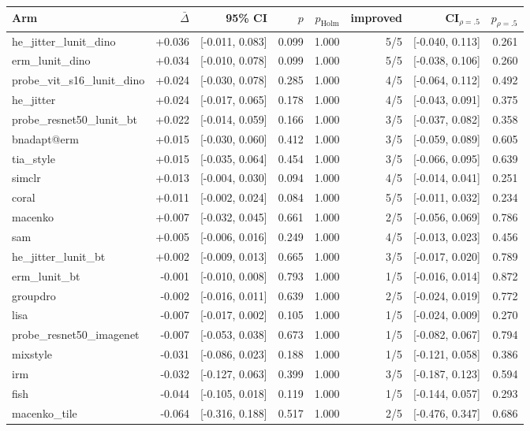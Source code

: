 \begin{tabular}{lrrrrrrr}
\toprule
Arm & $\bar\Delta$ & 95\% CI & $p$ & $p_\text{Holm}$ & improved & CI$_{\rho=.5}$ & $p_{\rho=.5}$ \\
\midrule
he\_jitter\_lunit\_dino & +0.036 & [-0.011, 0.083] & 0.099 & 1.000 & 5/5 & [-0.040, 0.113] & 0.261 \\
erm\_lunit\_dino & +0.034 & [-0.010, 0.078] & 0.099 & 1.000 & 5/5 & [-0.038, 0.106] & 0.260 \\
probe\_vit\_s16\_lunit\_dino & +0.024 & [-0.030, 0.078] & 0.285 & 1.000 & 4/5 & [-0.064, 0.112] & 0.492 \\
he\_jitter & +0.024 & [-0.017, 0.065] & 0.178 & 1.000 & 4/5 & [-0.043, 0.091] & 0.375 \\
probe\_resnet50\_lunit\_bt & +0.022 & [-0.014, 0.059] & 0.166 & 1.000 & 3/5 & [-0.037, 0.082] & 0.358 \\
bnadapt@erm & +0.015 & [-0.030, 0.060] & 0.412 & 1.000 & 3/5 & [-0.059, 0.089] & 0.605 \\
tia\_style & +0.015 & [-0.035, 0.064] & 0.454 & 1.000 & 3/5 & [-0.066, 0.095] & 0.639 \\
simclr & +0.013 & [-0.004, 0.030] & 0.094 & 1.000 & 4/5 & [-0.014, 0.041] & 0.251 \\
coral & +0.011 & [-0.002, 0.024] & 0.084 & 1.000 & 5/5 & [-0.011, 0.032] & 0.234 \\
macenko & +0.007 & [-0.032, 0.045] & 0.661 & 1.000 & 2/5 & [-0.056, 0.069] & 0.786 \\
sam & +0.005 & [-0.006, 0.016] & 0.249 & 1.000 & 4/5 & [-0.013, 0.023] & 0.456 \\
he\_jitter\_lunit\_bt & +0.002 & [-0.009, 0.013] & 0.665 & 1.000 & 3/5 & [-0.017, 0.020] & 0.789 \\
erm\_lunit\_bt & -0.001 & [-0.010, 0.008] & 0.793 & 1.000 & 1/5 & [-0.016, 0.014] & 0.872 \\
groupdro & -0.002 & [-0.016, 0.011] & 0.639 & 1.000 & 2/5 & [-0.024, 0.019] & 0.772 \\
lisa & -0.007 & [-0.017, 0.002] & 0.105 & 1.000 & 1/5 & [-0.024, 0.009] & 0.270 \\
probe\_resnet50\_imagenet & -0.007 & [-0.053, 0.038] & 0.673 & 1.000 & 1/5 & [-0.082, 0.067] & 0.794 \\
mixstyle & -0.031 & [-0.086, 0.023] & 0.188 & 1.000 & 1/5 & [-0.121, 0.058] & 0.386 \\
irm & -0.032 & [-0.127, 0.063] & 0.399 & 1.000 & 3/5 & [-0.187, 0.123] & 0.594 \\
fish & -0.044 & [-0.105, 0.018] & 0.119 & 1.000 & 1/5 & [-0.144, 0.057] & 0.293 \\
macenko\_tile & -0.064 & [-0.316, 0.188] & 0.517 & 1.000 & 2/5 & [-0.476, 0.347] & 0.686 \\
\bottomrule
\end{tabular}
